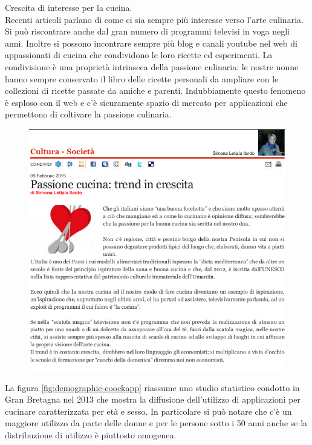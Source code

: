 \begin{itemize}
\begin{minipage}{0.45\textwidth}
\item
Crescita di interesse per la cucina.\\
Recenti articoli parlano di come
ci sia sempre più interesse verso l'arte culinaria. 
Si può riscontrare anche dal gran numero di programmi televisi in voga
negli anni. Inoltre si possono incontrare sempre più blog e canali
youtube nel web di appassionati di cucina che condividono le loro
ricette ed esperimenti.
La condivisione è una proprietà intrinseca della passione culinaria: le
nostre nonne hanno sempre conservato il libro delle ricette personali da
ampliare con le collezioni di ricette passate da amiche e parenti.
Indubbiamente questo fenomeno è esploso con il web e c'è sicuramente
spazio di mercato per applicazioni che permettono di coltivare la
passione culinaria.
\end{minipage}
\begin{minipage}{0.45\textwidth}
\begin{figure} [H]
	\centering
	\includegraphics[scale=0.3]{img/articolo-cucina.png}
\end{figure}
\end{minipage}

La figura \ref{fig:demographic-coockapp} riassume uno studio statistico
condotto in Gran Bretagna nel 2013 che mostra la diffusione
dell'utilizzo di applicazioni per cucinare caratterizzata per età e
sesso. In particolare si può notare che c'è un maggiore utilizzo da
parte delle donne e per le persone sotto i 50 anni anche se la
distribuzione di utilizzo è piuttosto omogenea.


\end{itemize}
